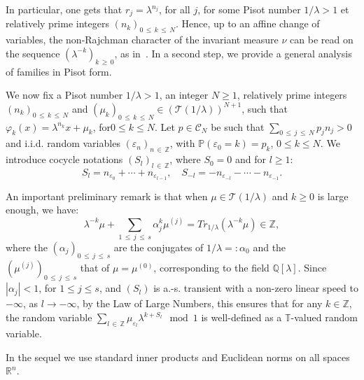 \documentclass[10pt]{amsart}
\theoremstyle{definition}\newtheorem{defi}[theo]{Definition}\newtheorem{rema}[theo]{Remark}\newtheorem{exam}[theo]{Example}\newtheorem{exem}[theo]{Example}\newtheorem{nota}[theo]{Notation}
\newcommand{\Pbb}{\mathbb P}
\newcommand{\Tbb}{\mathbb T}
\newcommand{\Rbb}{\mathbb R}
\newcommand{\Qbb}{\mathbb Q}
\newcommand{\Zbb}{\mathbb Z}
\newcommand{\Ccl}{\mathcal{C}}
\newcommand{\Tcl}{\mathcal{T}}
\begin{document}
In particular, one gets that $r_j=\lambda^{n_j}$, for all $j$, for some Pisot number $1/\lambda>1$ et relatively prime integers $(n_k)_{0\,\leq\,k\,\leq\,N}$. Hence, up to an affine change of variables, the non-Rajchman character of the invariant measure $\nu$ can be read on the sequence $(\lambda^{-k})_{k\,\geq\,0}$, as in~\cite{erdos}. In a second step, we provide a general analysis of families in Pisot form.


We now fix a Pisot number $1/\lambda>1$, an integer $N\geq 1$, relatively prime integers $(n_k)_{0\,\leq\,k\,\leq\,N}$ and $(\mu_k)_{0\,\leq\,k\,\leq\, N}\in ({\Tcl}(1/\lambda))^{N+1}$, such that $\varphi_k(x)=\lambda^{n_k}x+\mu_k$, for\linebreak$0\leq k\leq N$. Let $p\in{\Ccl}_N$ be such that $\sum_{0\,\leq\,j\,\leq\,N}p_jn_j>0$ and i.i.d. random variables $(\varepsilon_n)_{n\,\in\,\Zbb}$, with $\Pbb(\varepsilon_0=k)=p_k$, $0\leq k\leq N$. We introduce cocycle notations $(S_l)_{l\,\in\,\Zbb}$, where $S_0=0$ and for $l\geq1$:
\[
S_l=n_{\varepsilon_0}+\cdots+n_{\varepsilon_{l-1}},\quad S_{-l}=-n_{\varepsilon_{-l}}-\cdots-n_{\varepsilon_{-1}}.
\]


An important preliminary remark is that when $\mu\in{\Tcl}(1/\lambda)$ and $k\geq0$ is large enough, we have:
\[
\lambda^{-k}\mu+\sum_{1\,\leq\,j\,\leq\,s}\alpha_j^k\mu^{(j)}=Tr_{1/\lambda}(\lambda^{-k}\mu)\in\Zbb,
\]
where the $(\alpha_j)_{0\,\leq\,j\,\leq\,s}$ are the conjugates of $1/\lambda=:\alpha_0$ and the $(\mu^{(j)})_{0\,\leq\,j\,\leq\,s}$ that of $\mu=\mu^{(0)}$, corresponding to the field $\Qbb[\lambda]$. Since $|\alpha_j|<1$, for $1\leq j\leq s$, and $(S_l)$ is a.-s. transient with a non-zero linear speed to $-\infty$, as $l\rightarrow-\infty$, by the Law of Large Numbers, this ensures that for any $k\in\Zbb$, the random variable $\sum_{l\,\in\,\Zbb}\mu_{\varepsilon_l}\lambda^{k+S_l}\mod 1$ is well-defined as a $\Tbb$-valued random variable.


In the sequel we use standard inner products and Euclidean norms on all spaces $\Rbb^n$.
\end{document}

